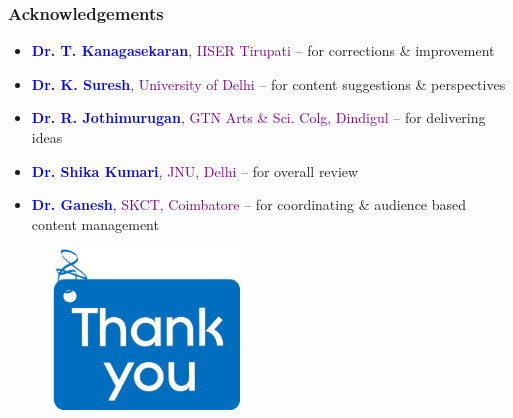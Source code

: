 \documentclass[newPxFont,sthlmFooter]{beamer}
\newcommand{\fs}{\footnotesize}
\begin{document}
\begin{frame}\frametitle{Acknowledgements}
\begin{itemize}
\fs
\item {\bf \textcolor{blue}{Dr. T. Kanagasekaran}}, \textcolor{purple}{IISER Tirupati} -- for corrections \& improvement
\item {\bf \textcolor{blue}{Dr. K. Suresh}}, \textcolor{purple}{University of Delhi} -- for content suggestions \& perspectives
\item {\bf \textcolor{blue}{Dr. R. Jothimurugan}}, \textcolor{purple}{GTN Arts \& Sci. Colg, Dindigul} -- for delivering ideas
\item {\bf \textcolor{blue}{Dr. Shika Kumari}}, \textcolor{purple}{JNU, Delhi} -- for overall review
\item {\bf \textcolor{blue}{Dr. Ganesh}}, \textcolor{purple}{SKCT, Coimbatore} -- for coordinating \& audience based content management
\end{itemize}
\end{frame}

\begingroup
{}
\begin{frame}
\begin{figure}
\centering
\includegraphics[width=2in]{figs/alt}
\end{figure}
\end{frame}
\endgroup
\end{document}
